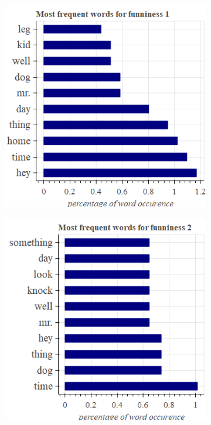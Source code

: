 \documentclass[draft,final,oneside]{vutinfth} %
\begin{document}
\begin{figure}
\centering

\begin{subfigure}[b]{0.45\textwidth}
\centering
\includegraphics[width=1.0\textwidth]{graphics/word_occurence/funniness_1}
\end{subfigure}\quad
\begin{subfigure}[b]{0.45\textwidth}
\centering
\includegraphics[width=1.0\textwidth]{graphics/word_occurence/funniness_2}
\end{subfigure}


\end{figure}
\end{document}
